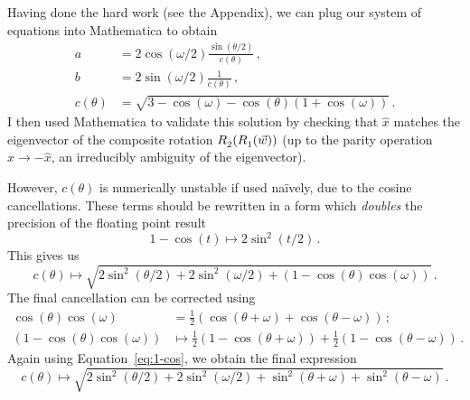\documentclass[12pt, nofootinbib, notitlepage]{revtex4}
\newcommand{\vecN}[1]{\hat{#1}}
\newcommand{\vict}{\vec{w}}
\newcommand{\ax}{\vecN{x}}
\begin{document}
Having done the hard work (see the Appendix),
we can plug our system of equations into Mathematica to obtain
\begin{align}
	a & = 2\cos(\omega/2)\frac{\sin(\theta/2)}{c(\theta)}
	\,,\\
	b & = 2\sin(\omega/2)\frac{1}{c(\theta)}
	\,,\\
	c(\theta) & = \sqrt{3 - \cos(\omega) - \cos(\theta)(1+\cos(\omega))}
	\,.
\end{align}
I then used Mathematica to validate this solution by checking that 
$\ax$ matches the eigenvector of the composite rotation $R_2\ds(R_1\ds(\vict))$
(up to the parity operation ${\ax \to -\ax}$,
an irreducibly ambiguity of the eigenvector).

However, $c(\theta)$ is numerically unstable if used na\"ively, 
due to the cosine cancellations. These terms should be rewritten 
in a form which \emph{doubles} the precision of the floating point result
\begin{equation}\label{eq:1-cos}
	1-\cos(t) \mapsto 2\sin^2(t/2)\,.
\end{equation}
This gives us
\begin{equation}
	c(\theta)\mapsto
	\sqrt{2\sin^2(\theta/2) + 2\sin^2(\omega/2) + (1 - \cos(\theta)\cos(\omega))}\,.
\end{equation}
The final cancellation can be corrected using
\begin{align}
	\cos(\theta)\cos(\omega) 
		& = \frac{1}{2}(\cos(\theta+\omega) + \cos(\theta-\omega))\,;\\
	(1 - \cos(\theta)\cos(\omega)) 
		&\mapsto \frac{1}{2}(1-\cos(\theta+\omega))
		 + \frac{1}{2}(1-\cos(\theta-\omega))\,.
\end{align}
Again using Equation~\ref{eq:1-cos}, we obtain the final expression
\begin{equation}
	c(\theta)\mapsto
	\sqrt{2\sin^2(\theta/2) + 2\sin^2(\omega/2)	
	+ \sin^2(\theta+\omega) 
	+ \sin^2(\theta-\omega)}\,.
\end{equation}
\end{document}
